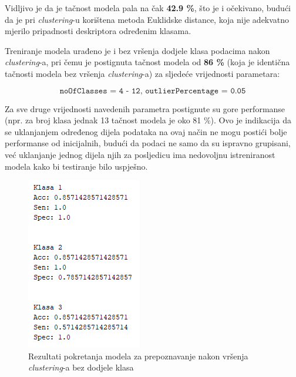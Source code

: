 \documentclass[12pt,a4paper]{article}
\begin{document}
Vidljivo je da je tačnost modela pala na čak \textbf{42.9 \%}, što je i očekivano, budući da je pri \textit{clustering}-u korištena metoda Euklidske distance, koja nije adekvatno mjerilo pripadnosti deskriptora određenim klasama.\\

\newpage

Treniranje modela urađeno je i bez vršenja dodjele klasa podacima nakon \textit{clustering}-a, pri čemu je postignuta tačnost modela od \textbf{86 \%} (koja je identična tačnosti modela bez vršenja \textit{clustering}-a) za sljedeće vrijednosti parametara:

\[\texttt{noOfClasses = 4 - 12, outlierPercentage = 0.05}\]

Za sve druge vrijednosti navedenih parametra postignute su gore performanse (npr. za broj klasa jednak 13 tačnost modela je oko 81 \%). Ovo je indikacija da se uklanjanjem određenog dijela podataka na ovaj način ne mogu postići bolje performanse od inicijalnih, budući da podaci ne samo da su ispravno grupisani, već uklanjanje jednog dijela njih za posljedicu ima nedovoljnu istreniranost modela kako bi testiranje bilo uspješno.

\begin{figure}[H]

\center
\includegraphics[scale=0.9]{slikaClustering2.png}
\caption{Rezultati pokretanja modela za prepoznavanje nakon vršenja \textit{clustering}-a bez dodjele klasa}
	
\end{figure}
\end{document}
